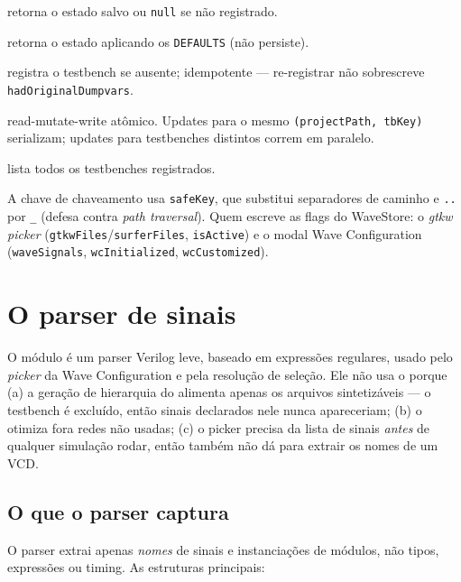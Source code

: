 \begin{description}[leftmargin=*]
  \item[\lstinline|get(projectPath, tbKey)|] retorna o estado salvo ou
    \lstinline|null| se não registrado.
  \item[\lstinline|read(projectPath, tbKey)|] retorna o estado aplicando os
    \lstinline|DEFAULTS| (não persiste).
  \item[\lstinline|ensureRegistered(...)|] registra o testbench se ausente;
    idempotente --- re-registrar não sobrescreve \lstinline|hadOriginalDumpvars|.
  \item[\lstinline|update(...)|] read-mutate-write atômico. Updates para o mesmo
    \lstinline|(projectPath, tbKey)| serializam; updates para testbenches
    distintos correm em paralelo.
  \item[\lstinline|list(projectPath)|] lista todos os testbenches registrados.
\end{description}

A chave de chaveamento usa \lstinline|safeKey|, que substitui
separadores de caminho e \lstinline|..| por \lstinline|_| (defesa contra
\emph{path traversal}). Quem escreve as flags do WaveStore: o \emph{gtkw
picker} (\lstinline|gtkwFiles|/\lstinline|surferFiles|, \lstinline|isActive|) e
o modal Wave Configuration (\lstinline|waveSignals|, \lstinline|wcInitialized|,
\lstinline|wcCustomized|).

\section{O parser de sinais}

O módulo  é um parser Verilog leve, baseado em
expressões regulares, usado pelo \emph{picker} da Wave Configuration e pela
resolução de seleção. Ele não usa o  porque (a) a geração de
hierarquia do  alimenta apenas os arquivos sintetizáveis --- o
testbench é excluído, então sinais declarados nele nunca apareceriam; (b) o
 otimiza fora redes não usadas; (c) o picker precisa da lista de
sinais \emph{antes} de qualquer simulação rodar, então também não dá para
extrair os nomes de um VCD.

\subsection{O que o parser captura}

O parser extrai apenas \emph{nomes} de sinais e instanciações de módulos, não
tipos, expressões ou timing. As estruturas principais:

